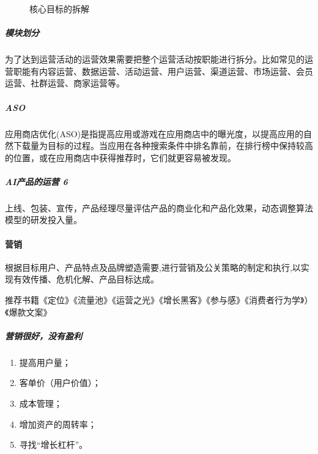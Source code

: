 \documentclass[letterpaper,11pt,english]{sphinxmanual}
\begin{document}
\begin{figure}[H]
\centering
\capstart

\noindent{}
\caption{核心目标的拆解}\label{\detokenize{chapter_idea/GTM:id20}}\end{figure}


\subparagraph{模块划分}
\label{\detokenize{chapter_idea/GTM:id15}}
为了达到运营活动的运营效果需要把整个运营活动按职能进行拆分。比如常见的运营职能有内容运营、数据运营、活动运营、用户运营、渠道运营、市场运营、会员运营、社群运营、商家运营等。


\subparagraph{ASO}
\label{\detokenize{chapter_idea/GTM:aso}}
应用商店优化(ASO)是指提高应用或游戏在应用商店中的曝光度，以提高应用的自然下载量为目标的过程。当应用在各种搜索条件中排名靠前，在排行榜中保持较高的位置，或在应用商店中获得推荐时，它们就更容易被发现。


\subparagraph{AI产品的运营 6\sphinxfootnotemark[399]}
\label{\detokenize{chapter_idea/GTM:ai-6}}%
\begin{footnotetext}[399]\sphinxAtStartFootnote
{}
%
\end{footnotetext}\ignorespaces 
上线、包装、宣传，产品经理尽量评估产品的商业化和产品化效果，动态调整算法模型的研发投入量。


\paragraph{营销}
\label{\detokenize{chapter_idea/GTM:id16}}
根据目标用户、产品特点及品牌塑造需要,进行营销及公关策略的制定和执行,以实现有效传播、危机化解、产品目标达成。%
\begin{footnote}[400]\sphinxAtStartFootnote
{}
%
\end{footnote}

推荐书籍《定位》《流量池》《运营之光》《增长黑客》《参与感》《消费者行为学》）《爆款文案》%
\begin{footnote}[401]\sphinxAtStartFootnote
{}
%
\end{footnote}


\subparagraph{营销很好，没有盈利}
\label{\detokenize{chapter_idea/GTM:id17}}\begin{enumerate}
%
\item {} 
提高用户量；

\item {} 
客单价（用户价值）；

\item {} 
成本管理；

\item {} 
增加资产的周转率；

\item {} 
寻找“增长杠杆”。

\end{enumerate}
\end{document}
